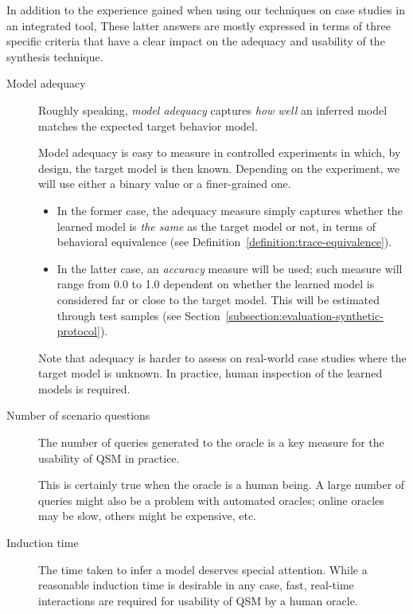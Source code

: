 In addition to the experience gained when using our techniques on case studies in an integrated tool, These latter answers are mostly expressed in terms of three specific criteria that have a clear impact on the adequacy and usability of the synthesis technique.
\begin{description}
\item[Model adequacy] Roughly speaking, \emph{model adequacy} captures \emph{how well} an inferred model matches the expected target behavior model. 

Model adequacy is easy to measure in controlled experiments in which, by design, the target model is then known. Depending on the experiment, we will use either a binary value or a finer-grained one.
\begin{itemize}
\item In the former case, the adequacy measure simply captures whether the learned model is \emph{the same} as the target model or not, in terms of behavioral equivalence (see Definition~\ref{definition:trace-equivalence}).
\item In the latter case, an \emph{accuracy} measure will be used; such measure will range from 0.0 to 1.0 dependent on whether the learned model is considered far or close to the target model. This will be estimated through test samples (see Section~\ref{subsection:evaluation-synthetic-protocol}).
\end{itemize}
Note that adequacy is harder to assess on real-world case studies where the target model is unknown. In practice, human inspection of the learned models is required.

\item[Number of scenario questions] The number of queries generated to the oracle is a key measure for the usability of QSM in practice. 

This is certainly true when the oracle is a human being. A large number of queries might also be a problem with automated oracles; online oracles may be slow, others might be expensive, etc.

\item[Induction time] The time taken to infer a model deserves special attention. While a reasonable induction time is desirable in any case, fast, real-time interactions are required for usability of QSM by a human oracle.
\end{description}

